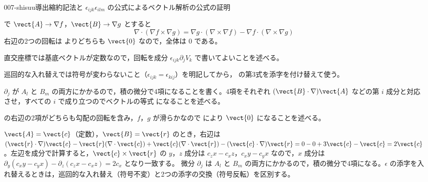 \documentclass[uplatex,dvipdfmx,a4paper,11pt]{jsarticle}
\begin{document}
\begin{mondai}{007-shisuu}{導出}{縮約記法と $\epsilon_{ijk}\epsilon_{ilm}$ の公式によるベクトル解析の公式の証明}
\begin{tadashii}
  で $\vect{A}\to\nabla f$，$\vect{B}\to\nabla g$ とすると
\[ \nabla\cdot(\nabla f\times\nabla g) = \nabla g\cdot(\nabla\times\nabla f) - \nabla f\cdot(\nabla\times\nabla g) \]
右辺の2つの回転は  よりどちらも $\vect{0}$ なので，全体は $0$ である。
\begin{ronten}
  \item {} 直交座標では基底ベクトルが定数なので，回転を成分 $\epsilon_{ijk}\partial_jV_k$ で書いてよいことを述べる。
  \item {} 巡回的な入れ替えでは符号が変わらないこと（$\epsilon_{ijk}=\epsilon_{kij}$）を明記してから， の第3式を添字を付け替えて使う。
  \item {} $\partial_j$ が $A_l$ と $B_m$ の両方にかかるので，積の微分で4項になることを書く。4項をそれぞれ $(\vect{B}\cdot\nabla)\vect{A}$ などの第 $i$ 成分と対応させ，すべての $i$ で成り立つのでベクトルの等式  になることを述べる。
  \item {}  の右辺の2項がどちらも勾配の回転を含み，$f$，$g$ が滑らかなので  により $\vect{0}$ になることを述べる。
\end{ronten}
\kenzan $\vect{A} = \vect{c}$（定数），$\vect{B} = \vect{r}$ のとき，右辺は $(\vect{r}\cdot\nabla)\vect{c} - \vect{r}(\nabla\cdot\vect{c}) + \vect{c}(\nabla\cdot\vect{r}) - (\vect{c}\cdot\nabla)\vect{r} = 0 - 0 + 3\vect{c} - \vect{c} = 2\vect{c}$。左辺を成分で計算すると，$\vect{c}\times\vect{r}$ の $y$，$z$ 成分は $c_zx - c_xz$，$c_xy - c_yx$ なので，$x$ 成分は $\partial_y(c_xy - c_yx) - \partial_z(c_zx - c_xz) = 2c_x$ となり一致する。
\tsumazuki 微分 $\partial_j$ は $A_l$ と $B_m$ の両方にかかるので，積の微分で4項になる。$\epsilon$ の添字を入れ替えるときは，巡回的な入れ替え（符号不変）と2つの添字の交換（符号反転）を区別する。
\end{tadashii}
\end{mondai}
\end{document}

